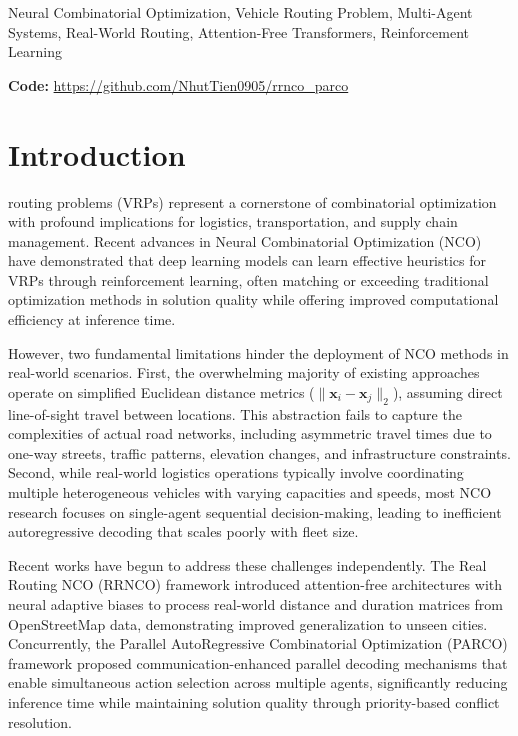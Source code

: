 \documentclass[journal,twoside,web]{ieeecolor}
\theoremstyle{definition}
\theoremstyle{remark}
\theoremstyle{definition}
\begin{document}
\begin{IEEEkeywords}
Neural Combinatorial Optimization, Vehicle Routing Problem, Multi-Agent Systems, Real-World Routing, Attention-Free Transformers, Reinforcement Learning
\end{IEEEkeywords}

\noindent\textbf{Code:}
\url{https://github.com/NhutTien0905/rrnco\_parco}

\section{Introduction}
\label{sec:introduction}
 routing problems (VRPs) represent a cornerstone of combinatorial optimization with profound implications for logistics, transportation, and supply chain management. Recent advances in Neural Combinatorial Optimization (NCO) have demonstrated that deep learning models can learn effective heuristics for VRPs through reinforcement learning\cite{kool2019attention,nazari2018reinforcement,kwon2020pomo}, often matching or exceeding traditional optimization methods in solution quality while offering improved computational efficiency at inference time.

However, two fundamental limitations hinder the deployment of NCO methods in real-world scenarios. First, the overwhelming majority of existing approaches operate on simplified Euclidean distance metrics ($\|\mathbf{x}_i - \mathbf{x}_j\|_2$), assuming direct line-of-sight travel between locations. This abstraction fails to capture the complexities of actual road networks, including asymmetric travel times due to one-way streets, traffic patterns, elevation changes, and infrastructure constraints. Second, while real-world logistics operations typically involve coordinating multiple heterogeneous vehicles with varying capacities and speeds, most NCO research focuses on single-agent sequential decision-making, leading to inefficient autoregressive decoding that scales poorly with fleet size.

Recent works have begun to address these challenges independently. The Real Routing NCO (RRNCO) framework\cite{rrnco2025} introduced attention-free architectures with neural adaptive biases to process real-world distance and duration matrices from OpenStreetMap\cite{openstreetmap} data, demonstrating improved generalization to unseen cities. Concurrently, the Parallel AutoRegressive Combinatorial Optimization (PARCO) framework\cite{parco2024} proposed communication-enhanced parallel decoding mechanisms that enable simultaneous action selection across multiple agents, significantly reducing inference time while maintaining solution quality through priority-based conflict resolution.
\end{document}

